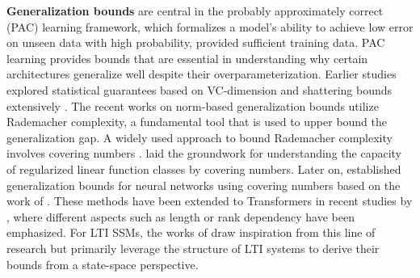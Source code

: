 \textbf{Generalization bounds} are central in the probably approximately correct (PAC) learning framework, which formalizes a model's ability to achieve  low error on unseen data with high probability, provided sufficient training data. PAC learning provides bounds that are essential in understanding why certain architectures generalize well despite their overparameterization. Earlier studies explored statistical guarantees based on VC-dimension and shattering bounds extensively \cite{karpinski1997polynomial, koiran1997neural, sontag1998learning, baum1988size, bartlett1998almost}. The recent works on norm-based generalization bounds utilize Rademacher complexity, a fundamental tool that is used to upper bound the generalization gap. A widely used approach to bound Rademacher complexity involves covering numbers \cite{vershynin2018high}. \citet{zhang2002covering} laid the groundwork for understanding the capacity of regularized linear function classes by covering numbers. Later on, \citet{bartlett2017spectrally} established generalization bounds for neural networks using covering numbers based on the work of \citet{zhang2002covering}. These methods have been extended to Transformers in recent studies by \citet{edelman2022inductive, trauger2024length_independent_transformer, truong2024rank}, where different aspects such as length or rank dependency have been emphasized. For LTI SSMs, the works of \citet{racz2024length, liu2024generalization} draw inspiration from this line of research but primarily leverage the structure of LTI systems to derive their bounds from a state-space perspective.
